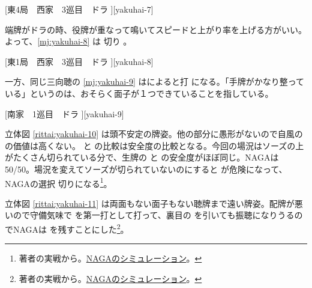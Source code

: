 \documentclass[../nankiru_main.tex]{subfiles}
\begin{document}
[東4局　西家　3巡目　ドラ ][yakuhai-7]

端牌がドラの時、役牌が重なって鳴いてスピードと上がり率を上げる方がいい。よって、\ref{mj:yakuhai-8} は  切り \citep{yuusee-yakuand2}。

[東1局　西家　3巡目　ドラ ][yakuhai-8]

一方、同じ三向聴の \ref{mj:yakuhai-9} は\citet[p.~15]{zero-teyaku}によると打  になる。「手牌がかなり整っている」というのは、おそらく面子が１つできていることを指している。

[南家　1巡目　ドラ ][yakuhai-9]

立体図 \ref{rittai:yakuhai-10} は頭不安定の牌姿。他の部分に愚形がないので自風の  の価値は高くない。 と  の比較は安全度の比較となる。今回の場況はソーズの上がたくさん切られている分で、生牌の  と  の安全度がほぼ同じ。NAGAは50/50。場況を変えてソーズが切られていないのにすると  が危険になって、NAGAの選択  切りになる\footnote{著者の実戦から。\href{https://naga.dmv.nico/htmls/b1ce439d70b8dfc48152e539f75e29d57763308a9de1dfafc95f65a9529f2757v2_2.html?tw=2}{NAGAのシミュレーション}。}。

\begin{rittai}[h]
  \centering
  \caption{場に安い  と生牌の自風  の二択}
  \label{rittai:yakuhai-10}
\end{rittai}

立体図 \ref{rittai:yakuhai-11} は両面もない面子もない聴牌まで遠い牌姿。配牌が悪いので守備気味で  を第一打として打って、裏目の  を引いても振聴になりうるのでNAGAは  を残すことにした\footnote{著者の実戦から。\href{https://naga.dmv.nico/htmls/b1ce439d70b8dfc48152e539f75e29d57763308a9de1dfafc95f65a9529f2757v2_2.html?tw=2}{NAGAのシミュレーション}。}。

\begin{rittai}[h]
  \centering
  \caption{}
  \label{rittai:yakuhai-11}
\end{rittai}
\end{document}
